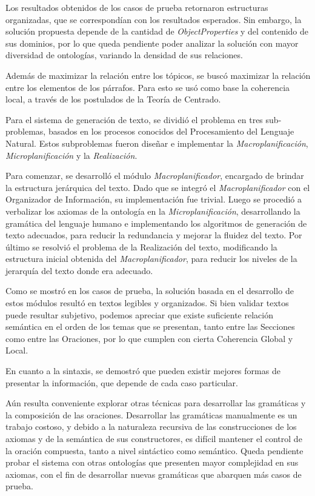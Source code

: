 Los resultados obtenidos de los casos de prueba retornaron estructuras organizadas, que se correspondían con los resultados esperados. Sin embargo, la solución propuesta depende de la cantidad de \emph{ObjectProperties} y del contenido de sus dominios, por lo que queda pendiente poder analizar la solución con mayor diversidad de ontologías, variando la densidad de sus relaciones.

Además de maximizar la relación entre los tópicos, se buscó maximizar la relación entre los elementos de los párrafos. Para esto se usó como base la coherencia local, a través de los postulados de la Teoría de Centrado.

Para el sistema de generación de texto, se dividió el problema en tres sub-problemas, basados en los procesos conocidos del Procesamiento del Lenguaje Natural. Estos subproblemas fueron diseñar e implementar la \textit{Macroplanificación},\textit{ Microplanificación} y  la \textit{Realización}. 

Para comenzar, se desarrolló el módulo \textit{Macroplanificador}, encargado de brindar la estructura jerárquica del texto. Dado que se integró el \textit{Macroplanificador} con el Organizador de Información, su implementación fue trivial.
Luego se procedió a verbalizar los axiomas de la ontología en la \textit{Microplanificación}, desarrollando la gramática del lenguaje humano e implementando los algoritmos de generación de texto adecuados, para reducir la redundancia y mejorar la fluidez del texto.
Por  último  se  resolvió  el  problema  de  la  Realización  del  texto,  modificando  la  estructura inicial obtenida del \textit{Macroplanificador}, para reducir los niveles de la jerarquía del texto donde era adecuado.

Como se mostró en los casos de prueba, la solución basada en el desarrollo de estos módulos resultó en textos legibles y organizados. Si bien validar textos puede resultar subjetivo, podemos apreciar que existe suficiente relación semántica en el orden de los temas que se presentan, tanto entre las Secciones como entre las Oraciones, por lo que cumplen con cierta Coherencia Global y Local.

En cuanto a la sintaxis, se demostró que pueden existir mejores formas de presentar la información, que depende de cada caso particular.

Aún resulta conveniente explorar otras técnicas para desarrollar las gramáticas y la composición de las oraciones. Desarrollar las gramáticas manualmente es un trabajo costoso, y debido a la naturaleza recursiva de las construcciones de los axiomas y de la semántica de sus constructores, es difícil mantener el control de la oración compuesta, tanto a nivel sintáctico como semántico. Queda pendiente probar el sistema con otras ontologías que presenten mayor complejidad en sus axiomas, con el fin de desarrollar nuevas gramáticas que abarquen más casos de prueba.

